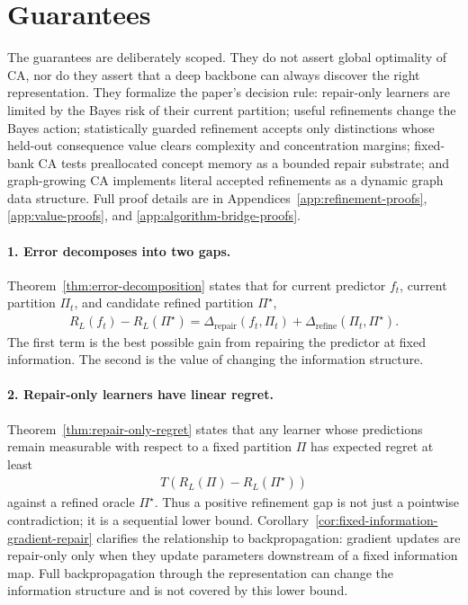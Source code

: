 \section{Guarantees}
\label{sec:guarantees}

The guarantees are deliberately scoped. They do not assert global optimality of CA, nor do they assert that a deep backbone can always discover the right representation. They formalize the paper's decision rule: repair-only learners are limited by the Bayes risk of their current partition; useful refinements change the Bayes action; statistically guarded refinement accepts only distinctions whose held-out consequence value clears complexity and concentration margins; fixed-bank CA tests preallocated concept memory as a bounded repair substrate; and graph-growing CA implements literal accepted refinements as a dynamic graph data structure. Full proof details are in Appendices~\ref{app:refinement-proofs}, \ref{app:value-proofs}, and \ref{app:algorithm-bridge-proofs}.

\paragraph{1. Error decomposes into two gaps.}
Theorem~\ref{thm:error-decomposition} states that for current predictor $f_t$, current partition $\Pi_t$, and candidate refined partition $\Pi^\star$,
\begin{align*}
R_L(f_t)-R_L(\Pi^\star)
=
\Delta_{\mathrm{repair}}(f_t,\Pi_t)
+
\Delta_{\mathrm{refine}}(\Pi_t,\Pi^\star).
\end{align*}
The first term is the best possible gain from repairing the predictor at fixed information. The second is the value of changing the information structure.

\paragraph{2. Repair-only learners have linear regret.}
Theorem~\ref{thm:repair-only-regret} states that any learner whose predictions remain measurable with respect to a fixed partition $\Pi$ has expected regret at least
\begin{align*}
T\left(R_L(\Pi)-R_L(\Pi^\star)\right)
\end{align*}
against a refined oracle $\Pi^\star$. Thus a positive refinement gap is not just a pointwise contradiction; it is a sequential lower bound. Corollary~\ref{cor:fixed-information-gradient-repair} clarifies the relationship to backpropagation: gradient updates are repair-only only when they update parameters downstream of a fixed information map. Full backpropagation through the representation can change the information structure and is not covered by this lower bound.

